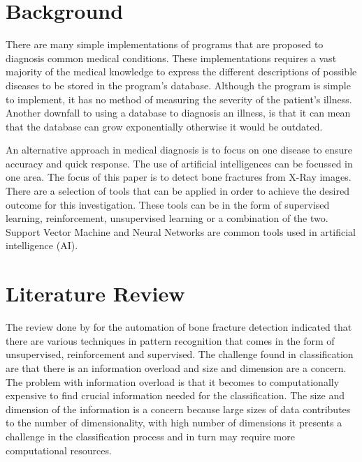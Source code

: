 \documentclass[11pt,twocolumn]{witseiepaper}
\begin{document}
	\section{Background}
	There are many simple implementations of programs that are proposed to diagnosis common medical conditions. These implementations requires a vast majority of the medical knowledge to express the different descriptions of possible diseases to be stored in the program's database. Although the program is simple to implement, it has no method of measuring the severity of the patient's illness. Another downfall to using a database to diagnosis an illness, is that it can mean that the database can grow exponentially otherwise it would be outdated. 
	
	An alternative approach in medical diagnosis is to focus on one disease to ensure accuracy and quick response. The use of artificial intelligences can be focussed in one area. The focus of this paper is to detect bone fractures from X-Ray images. There are a selection of tools that can be applied in order to achieve the desired outcome for this investigation. These tools can be in the form of supervised learning, reinforcement, unsupervised learning or a combination of the two. Support Vector Machine and Neural Networks are common tools used in artificial intelligence (AI).
	
	\section{Literature Review}
	The review done by \cite{Mahendran2011} for the automation of bone fracture detection indicated that there are various techniques in pattern recognition that comes in the form of unsupervised, reinforcement and supervised. The challenge found in classification are that there is an information overload and size and dimension are a concern. The problem with information overload is that it becomes to computationally expensive to find crucial information needed for the classification. The size and dimension of the information is a concern because large sizes of data contributes to the number of dimensionality, with high number of dimensions it presents a challenge in the classification process and in turn may require more computational resources.
	
\end{document}
